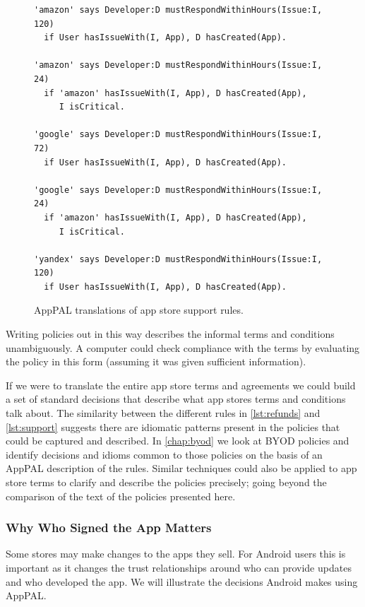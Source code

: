 \documentclass[thesis.tex]{subfiles}
\begin{document}
\begin{figure}\centering
  \begin{lstlisting}
'amazon' says Developer:D mustRespondWithinHours(Issue:I, 120)
  if User hasIssueWith(I, App), D hasCreated(App).

'amazon' says Developer:D mustRespondWithinHours(Issue:I, 24)
  if 'amazon' hasIssueWith(I, App), D hasCreated(App),
     I isCritical.
     
'google' says Developer:D mustRespondWithinHours(Issue:I, 72)
  if User hasIssueWith(I, App), D hasCreated(App).

'google' says Developer:D mustRespondWithinHours(Issue:I, 24)
  if 'amazon' hasIssueWith(I, App), D hasCreated(App),
     I isCritical.

'yandex' says Developer:D mustRespondWithinHours(Issue:I, 120)
  if User hasIssueWith(I, App), D hasCreated(App).
  \end{lstlisting}
  \caption{AppPAL translations of app store support rules.}
  \label{lst:support}
\end{figure}

Writing policies out in this way describes the informal terms and conditions
unambiguously. A computer could check compliance with the terms by evaluating
the policy in this form (assuming it was given sufficient information).

If we were to translate the entire app store terms and agreements we could build
a set of standard decisions that describe what app stores terms and conditions
talk about. The similarity between the different rules in \autoref{lst:refunds}
and \autoref{lst:support} suggests there are idiomatic patterns present in the
policies that could be captured and described. In \autoref{chap:byod} we look at
BYOD policies and identify decisions and idioms common to those policies on the
basis of an AppPAL description of the rules. Similar techniques could also be
applied to app store terms to clarify and describe the policies precisely; going
beyond the comparison of the text of the policies presented here.

\subsubsection{Why Who Signed the App Matters}

Some stores may make changes to the apps they sell. For Android users this is
important as it changes the trust relationships around who can provide updates
and who developed the app. We will illustrate the decisions Android makes using
AppPAL.
\end{document}
